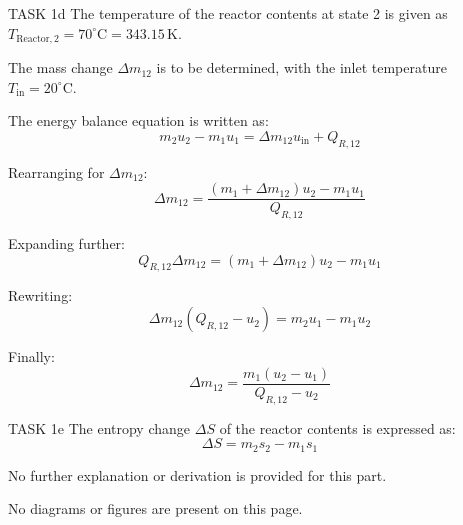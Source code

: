 TASK 1d  
The temperature of the reactor contents at state 2 is given as \( T_{\text{Reactor},2} = 70^\circ\text{C} = 343.15 \, \text{K} \).  

The mass change \( \Delta m_{12} \) is to be determined, with the inlet temperature \( T_{\text{in}} = 20^\circ\text{C} \).  

The energy balance equation is written as:  
\[
m_2 u_2 - m_1 u_1 = \Delta m_{12} u_{\text{in}} + Q_{R,12}
\]  

Rearranging for \( \Delta m_{12} \):  
\[
\Delta m_{12} = \frac{(m_1 + \Delta m_{12}) u_2 - m_1 u_1}{Q_{R,12}}
\]  

Expanding further:  
\[
Q_{R,12} \Delta m_{12} = (m_1 + \Delta m_{12}) u_2 - m_1 u_1
\]  

Rewriting:  
\[
\Delta m_{12} (Q_{R,12} - u_2) = m_2 u_1 - m_1 u_2
\]  

Finally:  
\[
\Delta m_{12} = \frac{m_1 (u_2 - u_1)}{Q_{R,12} - u_2}
\]  

TASK 1e  
The entropy change \( \Delta S \) of the reactor contents is expressed as:  
\[
\Delta S = m_2 s_2 - m_1 s_1
\]  

No further explanation or derivation is provided for this part.  

No diagrams or figures are present on this page.